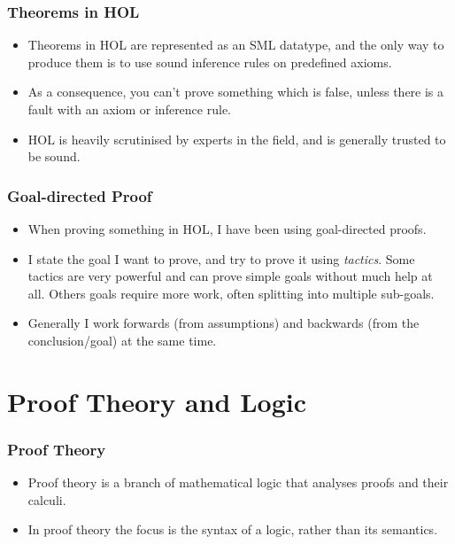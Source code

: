 \documentclass[english,svgnames,hide notes,12pt]{beamer}
\theoremstyle{definition}
\theoremstyle{remark}
\begin{document}
\begin{frame}
    \frametitle{Theorems in HOL}
    \begin{itemize}
        \item Theorems in HOL are represented as an SML datatype, and the only way to produce them is to use sound inference rules on predefined axioms.
        \item As a consequence, you can't prove something which is false, unless there is a fault with an axiom or inference rule.
        \item HOL is heavily scrutinised by experts in the field, and is generally trusted to be sound.
    \end{itemize}
\end{frame}

\begin{frame}
	\frametitle{Goal-directed Proof}
    \begin{itemize}
        \item When proving something in HOL, I have been using goal-directed proofs.
        \item I state the goal I want to prove, and try to prove it using \emph{tactics}. Some tactics are very powerful and can prove simple goals without much help at all. Others goals require more work, often splitting into multiple sub-goals. 
        \item Generally I work forwards (from assumptions) and backwards (from the conclusion/goal) at the same time.
    \end{itemize}
\end{frame}

\section{Proof Theory and Logic}

\begin{frame}
    \frametitle{Proof Theory}
    \begin{itemize}
        \item Proof theory is a branch of mathematical logic that analyses proofs and their calculi. 
        \item In proof theory the focus is the syntax of a logic, rather than its semantics.
    \end{itemize}
\end{frame}
\end{document}
